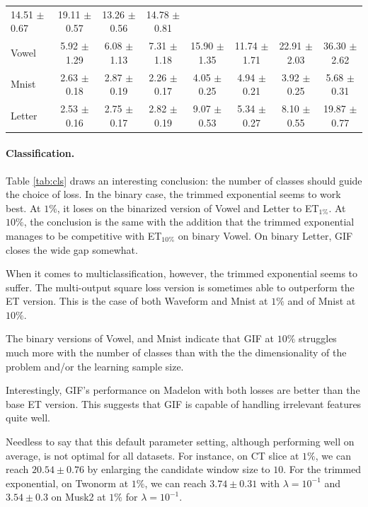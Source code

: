 \documentclass{article}
\newcommand{\bestA}{\cellcolor{orange}}
\newcommand{\bestB}{\cellcolor{dodgerblue}}
\begin{document}
\begin{table}[t]
\begin{center}
\begin{small}
\begin{sc}
\begin{tabular}{l|c|ccc|ccc}
14.51 $\pm$ 0.67 & 19.11 $\pm$ 0.57 & \bestB 13.26 $\pm$ 0.56 & 14.78 $\pm$ 
0.81 \\
Vowel & 5.92 $\pm$ 1.29 & \bestA 6.08 $\pm$ 1.13 & 7.31 $\pm$ 1.18 & 15.90 
$\pm$ 1.35 & \bestB 11.74 $\pm$ 1.71 & 22.91 $\pm$ 2.03 & 36.30 $\pm$ 2.62 \\
Mnist & 2.63 $\pm$ 0.18 & 2.87 $\pm$ 0.19 & \bestA 2.26 $\pm$ 0.17 & 4.05 $\pm$ 
0.25 & 4.94 $\pm$ 0.21 & \bestB 3.92 $\pm$ 0.25 & 5.68 $\pm$ 0.31 \\
Letter & 2.53 $\pm$ 0.16 & \bestA 2.75 $\pm$ 0.17 & 2.82 $\pm$ 0.19 & 9.07 
$\pm$ 0.53 & \bestB 5.34 $\pm$ 0.27 & 8.10 $\pm$ 0.55 & 19.87 $\pm$ 0.77 \\
\hline
\end{tabular}
\end{sc}
\end{small}
\end{center}
\vskip -0.1in
\end{table}


\paragraph{Classification.}
Table \ref{tab:cls} draws an interesting conclusion: the number of classes 
should guide the choice of loss. In the binary case, the trimmed exponential 
seems to work best. At $1\%$, it loses on the binarized version of Vowel and 
Letter to ET$_{1\%}$. At $10\%$, the conclusion is the same with the addition 
that the trimmed exponential manages to be competitive with ET$_{10\%}$ on 
binary Vowel. On binary Letter, GIF closes the wide gap somewhat.

When it comes to multiclassification, however, the trimmed exponential seems to 
suffer. The multi-output square loss version is sometimes able to outperform 
the ET version. This is the case of both Waveform and Mnist at $1\%$ and of 
Mnist at $10\%$. 

The binary versions of Vowel, and Mnist indicate that GIF at $10\%$ 
struggles much more with the number of classes than with the the dimensionality 
of the problem and/or the learning sample size. 

Interestingly, GIF's performance on Madelon with both losses are better than 
the base ET version. This suggests that GIF is capable of handling irrelevant 
features quite well.

Needless to say that this default parameter setting, although performing well 
on average, is not optimal for all datasets. For instance, on CT slice at 
$1\%$, we can reach $20.54 \pm 0.76$ by enlarging the candidate window size 
to $10$. 
For the trimmed exponential, on Twonorm at $1\%$, we can reach $3.74 \pm
0.31$ with $\lambda=10^{-1}$ and $3.54 \pm 0.3$ on Musk2 at $1\%$ for 
$\lambda=10^{-1}$.
\end{document}
